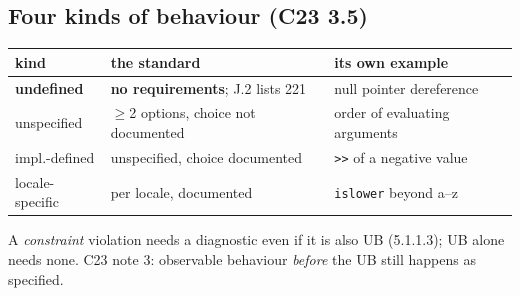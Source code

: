 \documentclass[8pt]{extarticle}
\newcommand\ct[1]{\texttt{#1}}
\begin{document}
\begin{multicols}{2}
\raggedright
\footnotesize{}

\section{Four kinds of behaviour (C23 3.5)}
{\scriptsize\setlength{\tabcolsep}{2pt}
\begin{tabular}{@{}L{17mm}L{31mm}L{28mm}@{}}
\toprule
\textbf{kind} & \textbf{the standard} & \textbf{its own example}\\ \midrule
\textbf{undefined} & \textbf{no requirements}; J.2 lists 221 & null pointer dereference\\
unspecified & $\ge$2 options, choice not documented & order of evaluating arguments\\
impl.-defined & unspecified, choice documented & \ct{>>} of a negative value\\
locale-specific & per locale, documented & \ct{islower} beyond a–z\\
\bottomrule
\end{tabular}}\par
A \emph{constraint} violation needs a diagnostic even if it is also UB (5.1.1.3); UB alone needs
none. C23 note 3: observable behaviour \emph{before} the UB still happens as specified.


\end{multicols}
\end{document}
